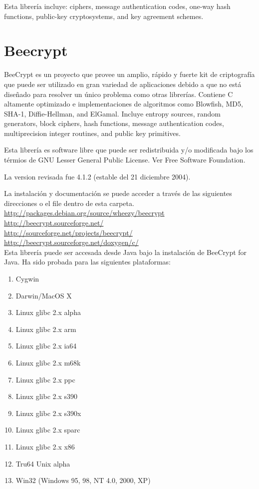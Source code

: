 \documentclass[spanish]{article}
\begin{document}
Esta librería incluye: ciphers, message authentication codes, one-way hash functions, public-key cryptosystems, and key agreement schemes.


\section{Beecrypt}
BeeCrypt es un proyecto que provee un amplio, rápido y fuerte kit de criptografía que puede ser utilizado en gran variedad de aplicaciones debido a que no está diseñado para resolver un único problema como otras librerías. Contiene C altamente optimizado e implementaciones de algoritmos como Blowfish, MD5, SHA-1, Diffie-Hellman, and ElGamal. Incluye entropy sources, random generators, block ciphers, hash functions, message authentication codes, multiprecision integer routines, and public key primitives.

Esta librería es software libre que puede ser redistribuida y/o modificada bajo los térmios de GNU Lesser General Public License. Ver Free Software Foundation.

La version revisada fue 4.1.2 (estable del 21 diciembre 2004).

La instalación y documentación se puede acceder a través de las siguientes direcciones o el file dentro de esta carpeta. \\
\url{http://packages.debian.org/source/wheezy/beecrypt}\\
\url{http://beecrypt.sourceforge.net/}\\
\url{http://sourceforge.net/projects/beecrypt/}\\
\url{http://beecrypt.sourceforge.net/doxygen/c/}\\

Esta librería puede ser accesada desde Java bajo la instalación de BeeCrypt for Java.
Ha sido probada para las siguientes plataformas:
\begin{enumerate}
\item Cygwin
\item Darwin/MacOS X
\item Linux glibc 2.x alpha
\item Linux glibc 2.x arm
\item Linux glibc 2.x ia64
\item Linux glibc 2.x m68k
\item Linux glibc 2.x ppc
\item Linux glibc 2.x s390
\item Linux glibc 2.x s390x
\item Linux glibc 2.x sparc
\item Linux glibc 2.x x86
\item Tru64 Unix alpha
\item Win32 (Windows 95, 98, NT 4.0, 2000, XP)
\end{enumerate}
\end{document}
